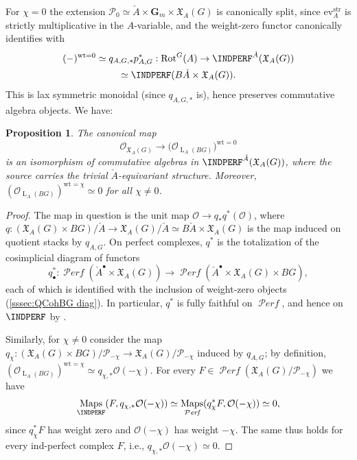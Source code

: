 \documentclass[12pt, oneside]{amsart}
\numberwithin{equation}{section}
\newtheorem{proposition}[subsubsection]{Proposition}
\theoremstyle{remark}
\theoremstyle{plain}
\DeclareMathOperator{\PERF}{\mathcal{P}\textit{erf}}
\DeclareMathOperator{\Map}{Maps}
\newcommand{\frX}{\mathfrak{X}}
\newcommand{\Loop}{\operatorname{L}}
\newcommand{\OO}{\mathcal{O}}
\newcommand{\GGm}{\mathbf{G}_{m}}
\newcommand{\ev}{\mathrm{ev}}
\newcommand{\Rot}{\operatorname{Rot}}
\begin{document}
For $\chi = 0$ the extension $\mathcal{P}_0 \simeq \check{A} \times \GGm \times \frX_A(G)$ is canonically split, since $\ev_A^{\mathrm{str}}$ is strictly multiplicative in the $A$-variable, and the weight-zero functor canonically identifies with
\begin{multline}
	(-)^{\mathrm{wt}=0} \simeq
	q_{A,G,*} p_{A,G}^* :
	\Rot^G(A) \to
	\INDPERF^{\check{A}}(\frX_A(G))
	\\
	\simeq \INDPERF(B\check{A} \times \frX_A(G)).
\end{multline}
This is lax symmetric monoidal (since $q_{A,G,*}$ is), hence preserves commutative algebra objects.
We have:

\begin{proposition}\label{prop:eqper trivialization}
The canonical map
\[
  \OO_{\frX_A(G)}
  \to
  \bigl(\OO_{\Loop_A(BG)}\bigr)^{\mathrm{wt}=0}
\]
is an isomorphism of commutative algebras in $\INDPERF^{\check{A}}(\frX_A(G))$, where the source carries the trivial $\check{A}$-equivariant structure.
Moreover, $(\OO_{\Loop_A(BG)})^{\mathrm{wt}=\chi} \simeq 0$ for all $\chi\ne 0$.
\end{proposition}

\begin{proof}
The map in question is the unit map $\OO \to q_*q^*(\OO)$, where $q : (\frX_A(G) \times BG)/\check{A} \to \frX_A(G)/\check{A} \simeq B\check{A} \times \frX_A(G)$ is the map induced on quotient stacks by $q_{A,G}$.
On perfect complexes, $q^*$ is the totalization of the cosimplicial diagram of functors
\[
  q_\bullet^* : \PERF(\check{A}^\bullet \times \frX_A(G)) \to
  \PERF(\check{A}^\bullet \times \frX_A(G) \times BG),
\]
each of which is identified with the inclusion of weight-zero objects (\ref{sssec:QCohBG diag}).
In particular, $q^*$ is fully faithful on $\PERF$, and hence on $\INDPERF$ by \cite[Prop.~5.3.5.11(1)]{LurieHTT}.

Similarly, for $\chi \ne 0$ consider the map $q_\chi : (\frX_A(G) \times BG)/\mathcal{P}_{-\chi} \to \frX_A(G)/\mathcal{P}_{-\chi}$ induced by $q_{A,G}$; by definition, $(\OO_{\Loop_A(BG)})^{\mathrm{wt}=\chi} \simeq q_{\chi,*}\OO(-\chi)$.
For every $F \in \PERF(\frX_A(G)/\mathcal{P}_{-\chi})$ we have
\[
  \Map_{\INDPERF}(F, q_{\chi,*}\OO(-\chi)) \simeq
  \Map_{\PERF}(q_\chi^*F, \OO(-\chi)) \simeq 0,
\]
since $q_\chi^*F$ has weight zero and $\OO(-\chi)$ has weight $-\chi$.
The same thus holds for every ind-perfect complex $F$, i.e., $q_{\chi,*}\OO(-\chi) \simeq 0$.
\end{proof}
\end{document}
